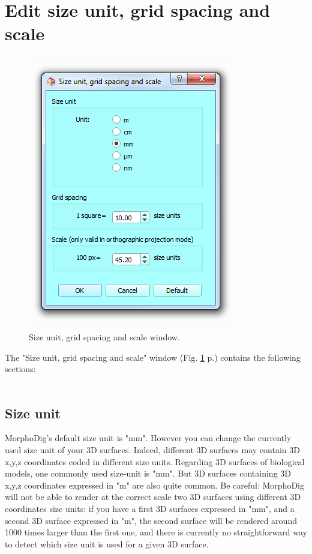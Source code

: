 \section{Edit size unit, grid spacing and scale}
\begin{figure}
  \centering
  \includegraphics[scale=0.55]{images/08/size_unit_grid_spacing.png} 
	\caption{Size unit, grid spacing and scale window.}
\label{size_unit_grid_spacing}
 
\end{figure}

\noindent The "Size unit, grid spacing and scale" window (Fig. \ref{size_unit_grid_spacing} p.\pageref{size_unit_grid_spacing}) contains the following sections:\\\\
\subsection{Size unit}
\noindent MorphoDig's default size unit is "mm". 
However you can change the currently used size unit of your 3D surfaces. Indeed, different 3D surfaces may contain 3D x,y,z coordinates coded in different size units. Regarding 3D surfaces of biological models, one commonly used size-unit is  "mm". But 3D surfaces containing 3D x,y,z coordinates expressed in "\si{\micro}m" are also quite common. Be careful: MorphoDig will not be able to render at the correct scale two 3D surfaces using different 3D coordinates size units: if you have a first 3D surfaces expressed in "mm", and a second 3D surface expressed in "\si{\micro}m", the second surface will be rendered around 1000 times larger than the first one, and there is currently no straightforward way to detect which size unit is used for a given 3D surface. 


